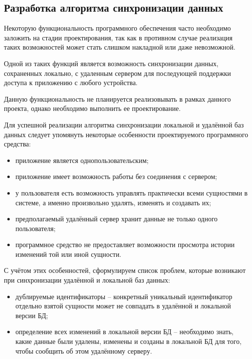 \subsection{Разработка алгоритма синхронизации данных}
\label{sec:design:sync}

Некоторую функциональность программного обеспечения часто необходимо заложить на стадии проектирования, так как в противном случае реализация таких возможностей может стать слишком накладной или даже невозможной.

Одной из таких функций является возможность синхронизации данных, сохраненных локально, с удаленным сервером для последующей поддержки доступа к приложению с любого устройства.

Данную функциональность не планируется реализовывать в рамках данного проекта, однако необходимо выполнить ее проектирование.

Для успешной реализации алгоритма синхронизации локальной и удалённой баз данных следует упомянуть некоторые особенности проектируемого программного средства:
\begin{itemize}
    \item приложение является однопользовательским;
    \item приложение имеет возможность работы без соединения с сервером;
    \item у пользователя есть возможность управлять практически всеми сущностями в системе, а именно произвольно удалять, изменять и создавать их;
    \item предполагаемый удалённый сервер хранит данные не только одного пользователя;
    \item программное средство не предоставляет возможности просмотра истории изменений той или иной сущности.
\end{itemize}

С учётом этих особенностей, сформулируем список проблем, которые возникают при синхронизации удалённой и локальной баз данных:
\begin{itemize}
    \item дублируемые идентификаторы -- конкретный уникальный идентификатор отдельно взятой сущности может не совпадать в удалённой и локальной версии БД;
    \item определение всех изменений в локальной версии БД -- необходимо знать, какие данные были удалены, изменены и созданы в локальной БД для того, чтобы сообщить об этом удалённому серверу.
\end{itemize}


